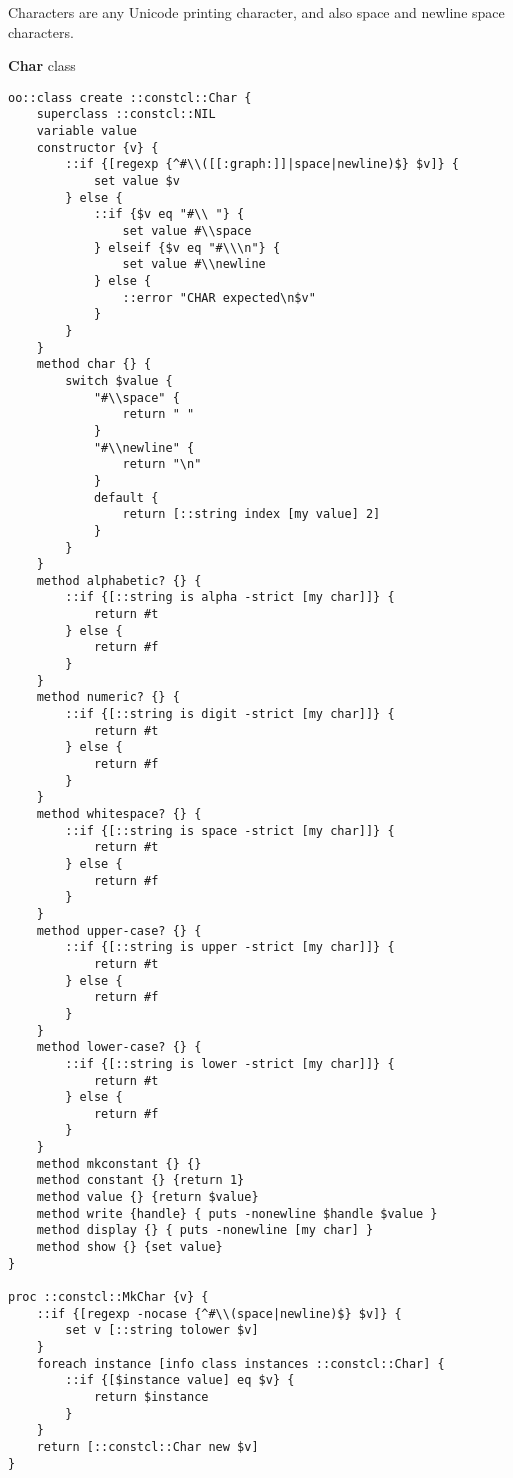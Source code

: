 \documentclass{report}
\begin{document}
Characters are any Unicode printing character, and also space and newline space characters.


\textbf{Char} class

\noindent\makebox[\linewidth]{\rule{\linewidth}{0.4pt}}
\begin{lstlisting}
oo::class create ::constcl::Char {
    superclass ::constcl::NIL
    variable value
    constructor {v} {
        ::if {[regexp {^#\\([[:graph:]]|space|newline)$} $v]} {
            set value $v
        } else {
            ::if {$v eq "#\\ "} {
                set value #\\space
            } elseif {$v eq "#\\\n"} {
                set value #\\newline
            } else {
                ::error "CHAR expected\n$v"
            }
        }
    }
    method char {} {
        switch $value {
            "#\\space" {
                return " "
            }
            "#\\newline" {
                return "\n"
            }
            default {
                return [::string index [my value] 2]
            }
        }
    }
    method alphabetic? {} {
        ::if {[::string is alpha -strict [my char]]} {
            return #t
        } else {
            return #f
        }
    }
    method numeric? {} {
        ::if {[::string is digit -strict [my char]]} {
            return #t
        } else {
            return #f
        }
    }
    method whitespace? {} {
        ::if {[::string is space -strict [my char]]} {
            return #t
        } else {
            return #f
        }
    }
    method upper-case? {} {
        ::if {[::string is upper -strict [my char]]} {
            return #t
        } else {
            return #f
        }
    }
    method lower-case? {} {
        ::if {[::string is lower -strict [my char]]} {
            return #t
        } else {
            return #f
        }
    }
    method mkconstant {} {}
    method constant {} {return 1}
    method value {} {return $value}
    method write {handle} { puts -nonewline $handle $value }
    method display {} { puts -nonewline [my char] }
    method show {} {set value}
}
 
proc ::constcl::MkChar {v} {
    ::if {[regexp -nocase {^#\\(space|newline)$} $v]} {
        set v [::string tolower $v]
    }
    foreach instance [info class instances ::constcl::Char] {
        ::if {[$instance value] eq $v} {
            return $instance
        }
    }
    return [::constcl::Char new $v]
}
\end{lstlisting}
\noindent\makebox[\linewidth]{\rule{\linewidth}{0.4pt}}
\end{document}
